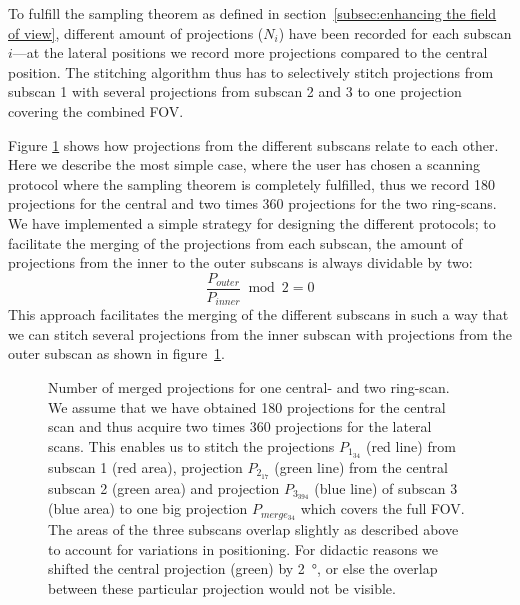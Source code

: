 To fulfill the sampling theorem as defined in section~\ref{subsec:enhancing the field of view}, different amount of projections ($N_{i}$) have been recorded for each subscan $i$---at the lateral positions we record more projections compared to the central position. The stitching algorithm thus has to selectively stitch projections from subscan 1 with several projections from subscan 2 and 3 to one projection covering the combined FOV.

Figure \ref{fig:amount of projections} shows how projections from the different subscans relate to each other. Here we describe the most simple case, where the user has chosen a scanning protocol where the sampling theorem is completely fulfilled, thus we record 180 projections for the central and two times 360 projections for the two ring-scans. We have implemented a simple strategy for designing the different protocols; to facilitate the merging of the projections from each subscan, the amount of projections from the inner to the outer subscans is always dividable by two: 
\begin{equation}
	\frac{P_{outer}}{P_{inner}} \bmod 2 = 0
\label{eq:Modulo}
\end{equation}
This approach facilitates the merging of the different subscans in such a way that we can stitch several projections from the inner subscan with projections from the outer subscan as shown in figure~\ref{fig:amount of projections}.

\begin{figure}
	\centering
	\caption{Number of merged projections for one central- and two ring-scan. We assume that we have obtained 180 projections for the central scan and thus acquire two times 360 projections for the lateral scans. This enables us to stitch the projections $P_{1_{34}}$ (red line) from subscan 1 (red area), projection $P_{2_{17}}$ (green line) from the central subscan 2 (green area) and projection $P_{3_{394}}$ (blue line) of subscan 3 (blue area) to one big projection $P_{merge_{34}}$ which covers the full FOV. The areas of the three subscans overlap slightly as described above to account for variations in positioning. For didactic reasons we shifted the central projection (green) by \SI{2}{\degree}, or else the overlap between these particular projection would not be visible.}%
	\label{fig:amount of projections}%
\end{figure}

